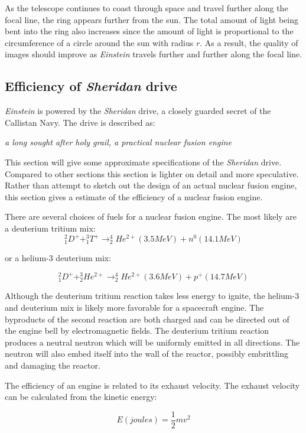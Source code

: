 \documentclass[12pt]{article} %
\begin{document}
As the telescope continues to coast through space and travel further along the focal line, the  ring appears further from the sun. The total amount of light being bent into the ring also increases since the amount of light is proportional to the circumference of a circle around the sun with radius $r$. As a result, the quality of images should improve as \textit{Einstein} travels further and further along the focal line.

\newpage
\subsection{Efficiency of \textit{Sheridan} drive}
\label{subsec:efficiency}
\textit{Einstein} is powered by the \textit{Sheridan} drive, a closely guarded secret of the Callistan Navy. The drive is described as:

\hspace{2cm} \textit{a long sought after holy grail, a practical nuclear fusion engine}

This section will give some approximate specifications of the \textit{Sheridan} drive. Compared to other sections this section is lighter on detail and more speculative. Rather than attempt to sketch out the design of an actual nuclear fusion engine, this section gives a estimate of the efficiency of a nuclear fusion engine.

There are several choices of fuels for a nuclear fusion engine. The most likely are a deuterium tritium mix:
$$^2_1D^+ + ^3_1T^+ \rightarrow ^4_2He^{2+} (3.5 MeV) + n^0 (14.1 MeV)$$

or a helium-3 deuterium mix:

$$^2_1D^+ + ^3_2He^{2+} \rightarrow ^4_2He^{2+} (3.6 MeV) + p^+ (14.7 MeV)$$

Although the deuterium tritium reaction takes less energy to ignite, the helium-3 and deuterium mix is likely more favorable for a spacecraft engine. The byproducts of the second reaction are both charged and can be directed out of the engine bell by electromagnetic fields. The deuterium tritium reaction produces a neutral neutron which will be uniformly emitted in all directions. The neutron will also embed itself into the wall of the reactor, possibly embrittling and damaging the reactor.

The efficiency of an engine is related to its exhaust velocity. The exhaust velocity can be calculated from the kinetic energy:

$$E (joules) = \frac{1}{2}mv^2$$
\end{document}
